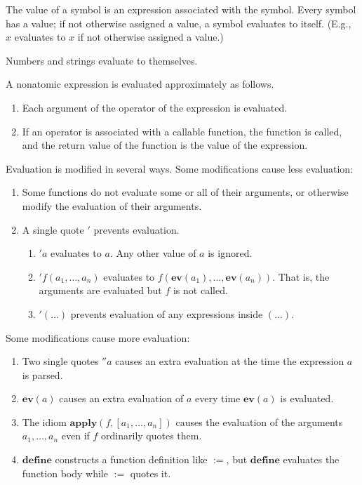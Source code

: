 \documentclass[12pt,leqno]{article}
\begin{document}
The value of a symbol is an expression associated with the symbol.
Every symbol has a value;
if not otherwise assigned a value, a symbol evaluates to itself.
(E.g., $x$ evaluates to $x$ if not otherwise assigned a value.)

Numbers and strings evaluate to themselves.

A nonatomic expression is evaluated approximately as follows.

\begin{enumerate}
\item Each argument of the operator of the expression is evaluated.
\item If an operator is associated with a callable function, the function is called,
and the return value of the function is the value of the expression.
\end{enumerate}

Evaluation is modified in several ways.
Some modifications cause less evaluation:

\begin{enumerate}
\item Some functions do not evaluate some or all of their arguments,
    or otherwise modify the evaluation of their arguments.
\item A single quote $'$ prevents evaluation.
    \begin{enumerate}
    \item $'a$ evaluates to $a$. Any other value of $a$ is ignored.
    \item $'f(a_1, \ldots, a_n)$ evaluates to $f(\mathbf{ev}(a_1), \ldots, \mathbf{ev}(a_n))$.
        That is, the arguments are evaluated but $f$ is not called.
    \item $'(\ldots)$ prevents evaluation of any expressions inside $(...)$.
    \end{enumerate}
\end{enumerate}

Some modifications cause more evaluation:

\begin{enumerate}
\item Two single quotes $''a$ causes an extra evaluation at the time the expression $a$ is parsed.
\item $\mathbf{ev}(a)$ causes an extra evaluation of $a$ every time $\mathbf{ev}(a)$ is evaluated.
\item The idiom $\mathbf{apply}(f, [a_1, \ldots, a_n])$ causes the evaluation
    of the arguments $a_1, \ldots, a_n$ even if $f$ ordinarily quotes them.
\item $\mathbf{define}$ constructs a function definition like $\mathbf{:=}$,
    but $\mathbf{define}$ evaluates the function body while $\mathbf{:=}$ quotes it.
\end{enumerate}
\end{document}
